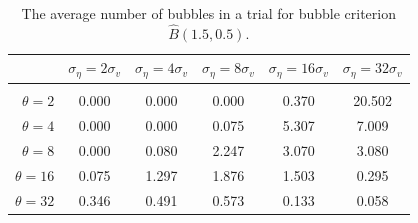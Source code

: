\documentclass[12pt]{article}
\begin{document}
\begin{table}[ht]
    \centering
\begin{tabular}{rccccc}
\hline  
            & \multicolumn{1}{l}{$\sigma_{\eta} =2\sigma_{v}$} & \multicolumn{1}{l}{$\sigma_{\eta} =4\sigma_{v}$} & \multicolumn{1}{l}{$\sigma_{\eta} =8\sigma_{v}$} & \multicolumn{1}{l}{$\sigma_{\eta} =16\sigma_{v}$} & \multicolumn{1}{l}{$\sigma_{\eta} =32\sigma_{v}$} \\ \hline  \vspace{-3mm} \\        
$\theta=2$             & 0.000                        & 0.000                        & 0.000                        & 0.370                         & 20.502                        \\ \hline
$\theta=4$             & 0.000                        & 0.000                        & 0.075                        & 5.307                         & 7.009                         \\ \hline
$\theta=8$             & 0.000                        & 0.080                        & 2.247                        & 3.070                         & 3.080                         \\ \hline
$\theta=16$            & 0.075                        & 1.297                        & 1.876                        & 1.503                         & 0.295                         \\ \hline
$\theta=32$            & 0.346                        & 0.491                        & 0.573                        & 0.133                         & 0.058                         \\ \hline
\end{tabular}
\caption{The average number of bubbles in a trial for bubble criterion $\widehat{B}(1.5,0.5)$.}
\label{bubcount}
\end{table}
\end{document}

